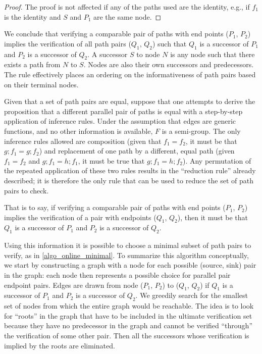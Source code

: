 \documentclass[sigplan,review]{acmart}
\begin{document}
{\begin{proof}
The proof is not affected if any of the paths used are the identity, e.g., if $f_1$ is the identity and $S$ and $P_1$ are the same node.
\end{proof}

We conclude that verifying a comparable pair of paths with end points ($P_1$, $P_2$) implies the verification of all path pairs ($Q_1$, $Q_2$) such that $Q_1$ is a successor of $P_1$ and $P_2$ is a successor of $Q_2$. A successor $S$ to node $N$ is any node such that there exists a path from $N$ to $S$. Nodes are also their own successors and predecessors.
The rule effectively places an ordering on the informativeness of path pairs based on their terminal nodes.

 Given that a set of path pairs are equal, suppose that one attempts to derive the proposition that a different parallel pair of paths is equal with a step-by-step application of inference rules.
 Under the assumption that edges are generic functions, and no other information is available, $F$ is a semi-group.
 The only inference rules allowed are composition (given that $f_1=f_2$, it must be that $g ; f_1 = g ; f_2$) and replacement of one path by a different, equal path (given $f_1=f_2$ and $g ; f_1 = h ; f_1 $, it must be true that $g ; f_1 = h ; f_2$). Any permutation of the repeated application of these two rules results in the ``reduction rule'' already described; it is therefore the only rule that can be used to reduce the set of path pairs to check.

That is to say, if verifying a comparable pair of paths with end points ($P_1$, $P_2$) implies the verification of a pair with endpoints ($Q_1$, $Q_2$), then it must be that $Q_1$ is a successor of $P_1$ and $P_2$ is a successor of $Q_2$. %

Using this information it is possible to choose a minimal subset of path pairs to verify, as in \ref{algo_online_minimal}.
%
To summarize this algorithm conceptually, we start by constructing a graph with a node for each possible (source, sink) pair in the graph: each node then represents a possible choice for parallel pair endpoint pairs. Edges are drawn from node ($P_1$, $P_2$) to ($Q_1$, $Q_2$) if $Q_1$ is a successor of $P_1$ and $P_2$ is a successor of $Q_2$. We greedily search for the smallest set of nodes from which the entire graph would be reachable. The idea is to look for ``roots'' in the graph that have to be included in the ultimate verification set because they have no predecessor in the graph and cannot be verified ``through'' the verification of some other pair. Then all the successors whose verification is implied by the roots are eliminated.

}
\end{document}
